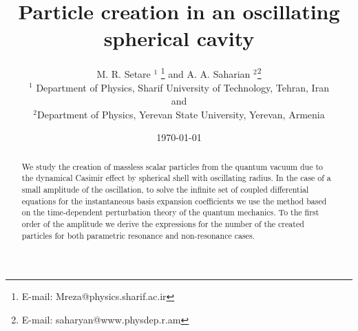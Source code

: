 \documentclass[a4paper,11pt]{article}
\begin{document}
\title{\bf {Particle creation in an oscillating spherical cavity }}
\author{
M. R. Setare $^1$ \footnote{E-mail: Mreza@physics.sharif.ac.ir}
 and A. A. Saharian  $^{2}$\footnote{E-mail: saharyan@www.physdep.r.am }  \\
 {$^1$ Department of Physics, Sharif University of
Technology, Tehran, Iran}\\ and \\
{$^{2}$}Department of Physics, Yerevan State University, Yerevan,
Armenia }
\date{\small{\today}}
 \maketitle
\begin{abstract}
We study the creation of massless scalar particles from the
quantum vacuum due to the dynamical Casimir effect by spherical
shell with oscillating radius. In the case of a small amplitude of
the oscillation, to solve the infinite set of coupled differential
equations for the instantaneous basis expansion coefficients we
use the method based on the time-dependent perturbation theory of
the quantum mechanics. To the first order of the amplitude we
derive the expressions for the number of the created particles for
both parametric resonance and non-resonance cases.
 \end{abstract}

\newpage
\end{document}
